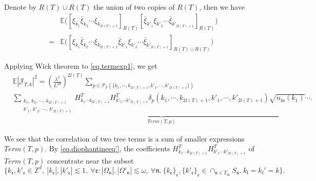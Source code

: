 Denote by $R(T)\cup R(T)$ the union of two copies of $R(T)$, then we have 
\begin{equation}
    \begin{split}
    &\mathbb{E}\Big([\xi_{k_1}\bar{\xi}_{k_2}\cdots\xi_{k_{2l(T)+1}}]_{R(T)}
    [\bar{\xi}_{k'_1}\xi_{k'_2}\cdots\bar{\xi}_{k'_{2l(T)+1}}]_{R(T)}\Big) 
    \\
    =& \mathbb{E}\Big([\xi_{k_1}\bar{\xi}_{k_2}\cdots\xi_{k_{2l(T)+1}}\bar{\xi}_{k'_1}\xi_{k'_2}\cdots\bar{\xi}_{k'_{2l(T)+1}}]_{R(T)\cup R(T)}\Big)
    \end{split}
\end{equation}

Applying Wick theorem to \eqref{eq.termexp1}, we get
\begin{equation}\label{eq.termexp'}
\begin{split}
    &\mathbb{E}|\mathcal{J}_{T,k}|^2=\left(\frac{\lambda^2}{L^{2d}}\right)^{2l(T)}
    \sum_{p\in \mathcal{P}_F(\{k_1,\cdots, k_{2l(T)+1}, k'_1,\cdots, k'_{2l(T)+1}\})}
    \\[0.5em]
    & \underbrace{\sum_{\substack{k_1,\, k_2,\, \cdots,\, k_{2l(T)+1}\\k'_1,\, k'_2,\, \cdots,\, k'_{2l(T)+1}}}
    H^T_{k_1\cdots k_{2l(T)+1}} H^{T}_{k'_1\cdots k'_{2l(T)+1}} \delta_{p}(k_1,\cdots, k_{2l(T)+1}, k'_1,\cdots, k'_{2l(T)+1})\sqrt{n_{\textrm{in}}(k_1)}\cdots}_{Term(T, p)}.
\end{split}
\end{equation}

We see that the correlation of two tree terms is a sum of smaller expressions $Term(T, p)$. By \eqref{eq.diophantineeq'}, the coefficients $H^T_{k_1\cdots k_{2l(T)+1}} H^{T}_{k'_1\cdots k'_{2l(T)+1}}$ of $Term(T, p)$ concentrate near the subset 
\begin{equation}\label{eq.diophantineequnpaired}
    \{k_{\mathfrak{e}}, k'_{\mathfrak{e}}\in \mathbb{Z}^d,\ |k_{\mathfrak{e}}|, |k'_{\mathfrak{e}}|\lesssim 1,\ \forall \mathfrak{e}: |\Omega_{\mathfrak{n}}|,|\Omega'_{\mathfrak{n}}|\lesssim \omega,\ \forall \mathfrak{n}. \ \{k_{\mathfrak{e}}\}_{\mathfrak{e}}, \{k'_{\mathfrak{e}}\}_{\mathfrak{e}}\in \cap_{\mathfrak{n}\in T_{\text{in}}} S_{\mathfrak{n}}.\ k_{\mathfrak{l}}=k_{\mathfrak{l}}'=k\}.
\end{equation}

